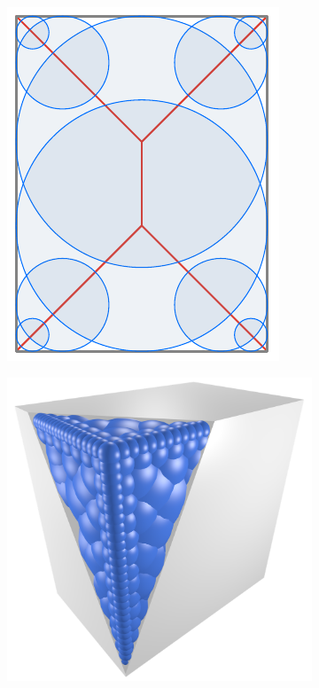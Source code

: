\begin{figure}
	\centering
	\begin{subfigure}{0.26\linewidth}
		\includegraphics[width=\linewidth]{figs/Box2D3D/3dmat_2d.pdf}
		\label{fig:3dmat_2d}
	\end{subfigure}
	\quad
	\begin{subfigure}{0.33\linewidth}
		\includegraphics[width=\linewidth]{figs/Box2D3D/3dmat_halfopen.png}

\end{subfigure}
\end{figure}
